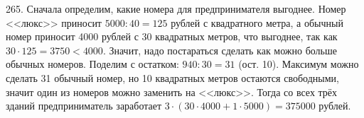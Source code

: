 265. Сначала определим, какие номера для предпринимателя выгоднее. Номер <<люкс>> приносит $5000:40=125$ рублей с квадратного метра, а обычный номер приносит 4000 рублей с 30 квадратных метров, что выгоднее, так как $30\cdot125=3750<4000.$ Значит, надо постараться сделать как можно больше обычных номеров. Поделим с остатком: $940:30=31$ (ост. 10). Максимум можно сделать 31 обычный номер, но 10 квадратных метров остаются свободными, значит один из номеров можно заменить на <<люкс>>. Тогда со всех трёх зданий предприниматель заработает $3\cdot(30\cdot4000+1\cdot5000)=375000$ рублей.\\
